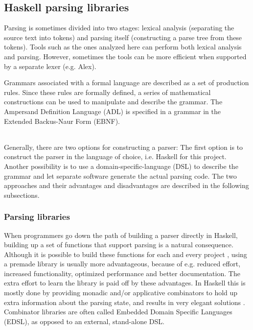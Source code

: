 
\subsection{Haskell parsing libraries}
\label{parsing:libraries}

%
%
%
Parsing is sometimes divided into two stages: lexical analysis (separating the source text into tokens) and parsing itself (constructing a parse tree from these tokens).
Tools such as the ones analyzed here can perform both lexical analysis and parsing.
However, sometimes the tools can be more efficient when supported by a separate lexer (e.g. Alex).

Grammars associated with a formal language are described as a set of production rules.
Since these rules are formally defined, a series of mathematical constructions can be used to manipulate and describe the grammar.
The Ampersand Definition Language (ADL) is specified in a grammar in the Extended Backus-Naur Form (EBNF).

~\\
%
Generally, there are two options for constructing a parser:
The first option is to construct the parser in the language of choice, i.e. Haskell for this project.
Another possibility is to use a domain-specific-language (DSL) to describe the grammar and let separate software generate the actual parsing code.
The two approaches and their advantages and disadvantages are described in the following subsections.

\subsubsection{Parsing libraries}
%
When programmers go down the path of building a parser directly in Haskell, building up a set of functions that support parsing is a natural consequence.
Although it is possible to build these functions for each and every project , using a premade library is usually more advantageous, because of e.g. reduced effort, increased functionality, optimized performance and better documentation.
The extra effort to learn the library is paid off by these advantages.
In Haskell this is mostly done by providing monadic and/or applicative combinators to hold up extra information about the parsing state, and results in very elegant solutions .
Combinator libraries are often called Embedded Domain Specific Languages (EDSL), as opposed to an external, stand-alone DSL.

